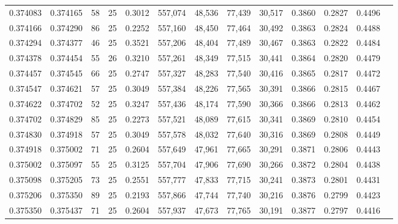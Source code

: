 \begin{tabular}{rrrrrrrrrrrrr}
0.374083 & 0.374165 &    58 &  25 &                                     0.3012 & 557,074 &  48,536 &  77,439 &  30,517 & 0.3860 & 0.2827 & 0.4496 \\
0.374166 & 0.374290 &    86 &  25 &                                     0.2252 & 557,160 &  48,450 &  77,464 &  30,492 & 0.3863 & 0.2824 & 0.4488 \\
0.374294 & 0.374377 &    46 &  25 &                                     0.3521 & 557,206 &  48,404 &  77,489 &  30,467 & 0.3863 & 0.2822 & 0.4484 \\
0.374378 & 0.374454 &    55 &  26 &                                     0.3210 & 557,261 &  48,349 &  77,515 &  30,441 & 0.3864 & 0.2820 & 0.4479 \\
0.374457 & 0.374545 &    66 &  25 &                                     0.2747 & 557,327 &  48,283 &  77,540 &  30,416 & 0.3865 & 0.2817 & 0.4472 \\
0.374547 & 0.374621 &    57 &  25 &                                     0.3049 & 557,384 &  48,226 &  77,565 &  30,391 & 0.3866 & 0.2815 & 0.4467 \\
0.374622 & 0.374702 &    52 &  25 &                                     0.3247 & 557,436 &  48,174 &  77,590 &  30,366 & 0.3866 & 0.2813 & 0.4462 \\
0.374702 & 0.374829 &    85 &  25 &                                     0.2273 & 557,521 &  48,089 &  77,615 &  30,341 & 0.3869 & 0.2810 & 0.4454 \\
0.374830 & 0.374918 &    57 &  25 &                                     0.3049 & 557,578 &  48,032 &  77,640 &  30,316 & 0.3869 & 0.2808 & 0.4449 \\
0.374918 & 0.375002 &    71 &  25 &                                     0.2604 & 557,649 &  47,961 &  77,665 &  30,291 & 0.3871 & 0.2806 & 0.4443 \\
0.375002 & 0.375097 &    55 &  25 &                                     0.3125 & 557,704 &  47,906 &  77,690 &  30,266 & 0.3872 & 0.2804 & 0.4438 \\
0.375098 & 0.375205 &    73 &  25 &                                     0.2551 & 557,777 &  47,833 &  77,715 &  30,241 & 0.3873 & 0.2801 & 0.4431 \\
0.375206 & 0.375350 &    89 &  25 &                                     0.2193 & 557,866 &  47,744 &  77,740 &  30,216 & 0.3876 & 0.2799 & 0.4423 \\
0.375350 & 0.375437 &    71 &  25 &                                     0.2604 & 557,937 &  47,673 &  77,765 &  30,191 & 0.3877 & 0.2797 & 0.4416 \\

\end{tabular}
